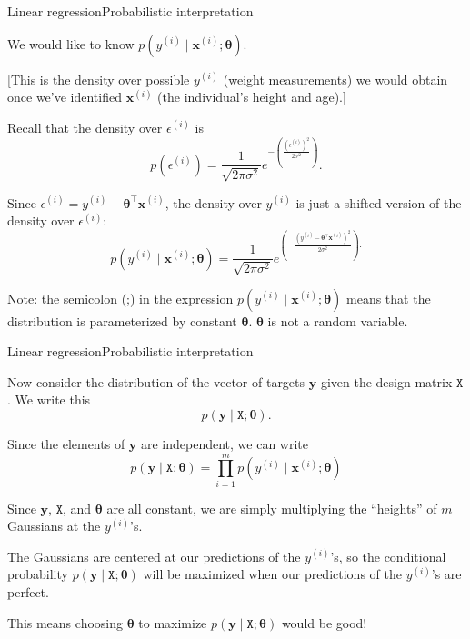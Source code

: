 \documentclass{beamer}
\renewcommand{\vec}[1]{\boldsymbol{#1}}
\newcommand{\mat}[1]{\mathtt{#1}}
\begin{document}
\begin{frame}{Linear regression}{Probabilistic interpretation}

  We would like to know $p(y^{(i)} \mid \vec{x}^{(i)} ; \vec{\theta})$.

  \medskip

  [This is the density over possible $y^{(i)}$ (weight measurements)
    we would obtain once we've identified $\vec{x}^{(i)}$ (the
    individual's height and age).]

  \medskip

  Recall that the density over $\epsilon^{(i)}$ is
  \[ p(\epsilon^{(i)}) = \frac{1}{\sqrt{2\pi\sigma^2}}
     e^{-\left(\frac{(\epsilon^{(i)})^2}{2\sigma^2}\right)}. \]

  \medskip
  
  Since $\epsilon^{(i)} = y^{(i)} - \vec{\theta}^\top\vec{x}^{(i)}$,
  the density
  over $y^{(i)}$ is just a shifted version of the density over $\epsilon^{(i)}$:
  \[ p(y^{(i)} \mid \vec{x}^{(i)} ; \vec{\theta} ) = \frac{1}{\sqrt{2\pi\sigma^2}} e^{\left( -\frac{(y^{(i)}-\vec{\theta}^\top\vec{x}^{(i)})^2}{2\sigma^2} \right) .} \]

  \medskip

  Note: the semicolon (;) in the expression $p(y^{(i)} \mid
  \vec{x}^{(i)} ; \vec{\theta} )$ means that the distribution is
  \alert{parameterized} by constant $\vec{\theta}$. $\vec{\theta}$ is
  not a random variable.
   
\end{frame}


\begin{frame}{Linear regression}{Probabilistic interpretation}

  Now consider the distribution of the vector of targets $\vec{y}$
  given the \alert{design matrix} $\mat{X}$. We write this
  \[ p(\vec{y} \mid \mat{X} ; \vec{\theta}) .\]

  \medskip

  Since the elements of $\vec{y}$ are independent, we can write
  \[ p(\vec{y} \mid \mat{X} ; \vec{\theta}) = \prod_{i=1}^m
  p(y^{(i)} \mid \vec{x}^{(i)} ; \vec{\theta} ) \]

  \medskip

  Since $\vec{y}$, $\mat{X}$, and $\vec{\theta}$ are all constant,
  we are simply multiplying the ``heights'' of $m$ Gaussians at the $y^{(i)}$'s.

  \medskip

  The Gaussians are centered at our \alert{predictions} of the
  $y^{(i)}$'s, so the conditional probability $p(\vec{y} \mid \mat{X}
  ; \vec{\theta})$ will be \alert{maximized} when our predictions of
  the $y^{(i)}$'s are \alert{perfect}.
  
  \medskip

  This means \alert{choosing $\vec{\theta}$ to maximize $p(\vec{y} \mid
  \mat{X} ; \vec{\theta})$} would be good!

\end{frame}
\end{document}
